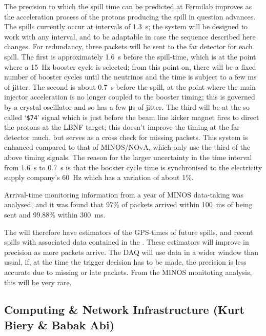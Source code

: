 The precision to which the spill time can be predicted at Fermilab
improves as the acceleration process of the protons producing the
spill in question advances.  The spills currently occur at intervals
of \SI{1.3}{\s}; the system will be designed to work with any interval, and
to be adaptable in case the sequence described here changes.  For
redundancy, three packets will be sent to the far detector for each
spill.  The first is approximately \SI{1.6}{\s} before the spill-time, which
is at the point where a \SI{15}{\Hz} booster cycle is selected; from this
point on, there will be a fixed number of booster cycles until the
neutrinos and the time is subject to a few ms of jitter.  The second
is about \SI{0.7}{\s} before the spill, at the point where the main injector
acceleration is no longer coupled to the booster timing; this is
governed by a crystal oscillator and so has a few \si{\us} of jitter.
The third will be at the so called `\texttt{\$74}' signal which is just before the beam line kicker magnet fires
to direct the protons at the LBNF target; this doesn't improve the
timing at the far detector much, but serves as a cross check for
missing packets.  This system is enhanced compared to that of
MINOS/NOvA, which only use the third of the above timing signals.  The
reason for the larger uncertainty in the time interval from \SI{1.6}{\s} to
\SI{0.7}{\s} is that the booster cycle time is synchronised to the
electricity supply company's \SI{60}{\Hz} which has a variation of about
1\%.

Arrival-time monitoring information from a year of MINOS data-taking
was analysed, and it was found that 97\% of packets arrived within
\SI{100}{\ms} of being sent and 99.88\% within \SI{300}{\ms}.

The  will therefore have estimators of the GPS-times of
future spills, and recent spills with associated data contained in the
. These estimators will improve in precision as
more packets arrive.  The DAQ will use data in a wider window than
usual, if, at the time the trigger decision has to be made, the
precision is less accurate due to missing or late packets.  From the
MINOS monitoting analysis, this will be very rare.

\subsection{Computing \& Network Infrastructure (Kurt Biery \& Babak Abi)}
\label{sec:fdsp-daq-infra}

